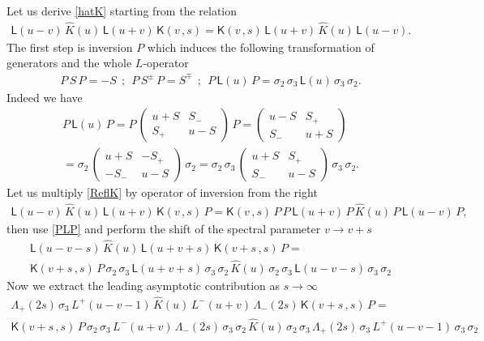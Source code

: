 \documentclass[11pt]{article}
\numberwithin{equation}{section}
\theoremstyle{plain}
\theoremstyle{definition}
\newcommand{\K}{\mathsf{K}}
\begin{document}
Let us derive \eqref{hatK} starting from the relation
\begin{align} \label{ReflK}
	\mathsf{L}(u-v)\,\hat{K}(u)\,\mathsf{L}(u+v)\,\K(v\,,s) = 
	\K(v\,,s)\,\mathsf{L}(u+v)\,\hat{K}(u)\,\mathsf{L}(u-v).
\end{align}
The first step is inversion $P$ which induces 
the following transformation of generators and the whole $L$-operator 
\begin{align}\label{PLP} 
	P\,S\,P = - S \ \ ;\ \  P\,S^{\pm}\,P = S^{\mp} \ \ ;\ \ 
	P\,\mathsf{L}(u)\,P  = \sigma_2\,\sigma_3\,\mathsf{L}(u)\,\sigma_3\,\sigma_2.
\end{align}
Indeed we have 
\begin{multline*}
	P\,\mathsf{L}(u)\,P  = 
	P\,\left(\begin{array}{cc}
		u + S & S_{-} \\
		S_{+} & u - S \end{array} \right)\,P = 
	\left(\begin{array}{cc}
		u - S & S_{+} \\
		S_{-} & u + S \end{array} \right) \\
	= \sigma_2\,\left(\begin{array}{cc}
		u + S & -S_{+} \\
		-S_{-} & u - S \end{array} \right)\,\sigma_2 = 
	\sigma_2\,\sigma_3\,
	\left(\begin{array}{cc}
		u + S & S_{+} \\
		S_{-} & u - S \end{array} \right)\,
	\sigma_3\,\sigma_2.
\end{multline*}
Let us multiply \eqref{ReflK} by operator of inversion from the right 
\begin{align*}
	\mathsf{L}(u-v)\,\hat{K}(u)\,\mathsf{L}(u+v)\,\K(v\,,s)\,P = 
	\K(v\,,s)\,P\,P\,\mathsf{L}(u+v)\,P\,\hat{K}(u)\,P\,\mathsf{L}(u-v)\,P ,
\end{align*}
then use \eqref{PLP} and perform the shift of the spectral 
parameter $v \to v+s$ 
\begin{multline*}
	\mathsf{L}(u-v-s)\,\hat{K}(u)\,\mathsf{L}(u+v+s)\,\K(v+s\,,s)\,P = \\
	\K(v+s\,,s)\,P\,\sigma_2\,\sigma_3\,\mathsf{L}(u+v+s)\,\sigma_3\,\sigma_2\,
	\hat{K}(u)\,\sigma_2\,\sigma_3\,\mathsf{L}(u-v-s)\,\sigma_3\,\sigma_2 
\end{multline*}
Now we extract the leading asymptotic contribution as $s\to\infty$
\begin{multline}\label{s}
	\Lambda_{+}(2s)\,\sigma_3\, L^{+}(u-v-1)\,\hat{K}(u)\,
	L^{-}(u+v)\,\Lambda_{-}(2s)\,\K(v+s\,,s)\,P = \\[4pt]
	\K(v+s\,,s)\,P\,\sigma_2\,\sigma_3\,L^{-}(u+v)\,\Lambda_{-}(2s)\,\sigma_3\,\sigma_2\,
	\hat{K}(u)\,\sigma_2\,\sigma_3\,\Lambda_{+}(2s)\,\sigma_3\,
	L^{+}(u-v-1)\,\sigma_3\,\sigma_2 
\end{multline}
\end{document}
